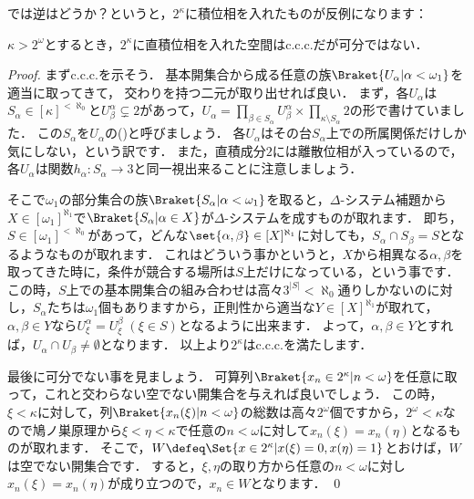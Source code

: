 \documentclass[a4j]{ltjsarticle}
\renewcommand{\emph}[1]{\textsf{\textgt{#1}}}
\begin{document}
では逆はどうか？というと，$2^\kappa$に積位相を入れたものが反例になります：
\begin{lemma}
 $\kappa > 2^\omega$とするとき，$2^\kappa$に直積位相を入れた空間はc.c.c.だが可分ではない．
\end{lemma}
\begin{proof}
 まずc.c.c.を示そう．
 基本開集合から成る任意の族$\Braket{U_\alpha | \alpha < \omega_1}$を適当に取ってきて，
 交わりを持つ二元が取り出せれば良い．
 まず，各$U_\alpha$は$S_\alpha \in [\kappa]^{<\aleph_0}$と$U^\alpha_\beta \subsetneq 2$があって，$U_\alpha = \prod_{\beta \in S_\alpha} U^\alpha_\beta \times \prod_{\kappa \setminus S_\alpha} 2$の形で書けていました．
 この$S_\alpha$を$U_\alpha$の\emph{台}(\emph{support})と呼びましょう．
 各$U_\alpha$はその台$S_\alpha$上での所属関係だけしか気にしない，という訳です．
 また，直積成分$2$には離散位相が入っているので，各$U_\alpha$は関数$h_\alpha : S_\alpha \to 3$と同一視出来ることに注意しましょう．

 そこで$\omega_1$の部分集合の族$\Braket{S_\alpha | \alpha < \omega_1}$を取ると，$\Delta$-システム補題から$X \in [\omega_1]^{\aleph_1}$で$\Braket{S_\alpha | \alpha \in X}$が$\Delta$-システムを成すものが取れます．
 即ち，$S \in [\omega_1]^{<\aleph_0}$があって，どんな$\set{\alpha, \beta} \in [X]^{\aleph_1}$に対しても，$S_\alpha \cap S_\beta = S$となるようなものが取れます．
 これはどういう事かというと，$X$から相異なる$\alpha, \beta$を取ってきた時に，条件が競合する場所は$S$上だけになっている，という事です．
 この時，$S$上での基本開集合の組み合わせは高々$3^{|S|} < \aleph_0$通りしかないのに対し，$S_\alpha$たちは$\omega_1$個もありますから，正則性から適当な$Y \in [X]^{\aleph_1}$が取れて，$\alpha, \beta \in Y$なら$U^\alpha_\xi = U^\beta_\xi \;(\xi \in S)$となるように出来ます．
 よって，$\alpha, \beta \in Y$とすれば，$U_\alpha \cap U_\beta \neq \emptyset$となります．
 以上より$2^\kappa$はc.c.c.を満たします．

 最後に可分でない事を見ましょう．
 可算列$\Braket{x_n \in 2^\kappa | n < \omega}$を任意に取って，これと交わらない空でない開集合を与えれば良いでしょう．
 この時，$\xi < \kappa$に対して，列$\Braket{x_n(\xi) | n < \omega}$の総数は高々$2^\omega$個ですから，$2^\omega < \kappa$なので鳩ノ巣原理から$\xi < \eta < \kappa$で任意の$n < \omega$に対して$x_n(\xi) = x_n(\eta)$となるものが取れます．
 そこで，$W \defeq \Set{x \in 2^\kappa | x(\xi) = 0, x(\eta) = 1}$とおけば，$W$は空でない開集合です．
 すると，$\xi, \eta$の取り方から任意の$n < \omega$に対し$x_n(\xi) = x_n(\eta)$が成り立つので，$x_n \in W$となります． \qed
\end{proof}
\end{document}
